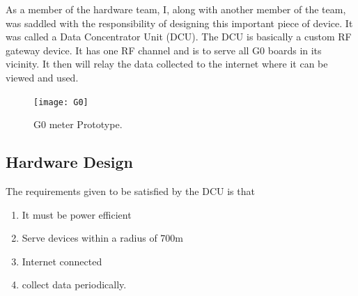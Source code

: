 As a member of the hardware team, I, along with another member of the team, was saddled with the responsibility of designing this important piece of device. It was called a Data Concentrator Unit (DCU). The DCU is basically a custom RF gateway device. It has one RF channel and is to serve all G0 boards in its vicinity. It then will relay the data collected to the internet where it can be viewed and used.
\begin{figure}
    \centering
    \texttt{[image: G0]}
	\caption{G0 meter Prototype.}
    \label{fig:g1_pix}
\end{figure}
\subsection{Hardware Design}
The requirements given to be satisfied by the DCU is that
\begin{enumerate}
\item It must be power efficient
\item Serve devices within a radius of 700m
\item Internet connected
\item collect data periodically.
\end{enumerate}
  
